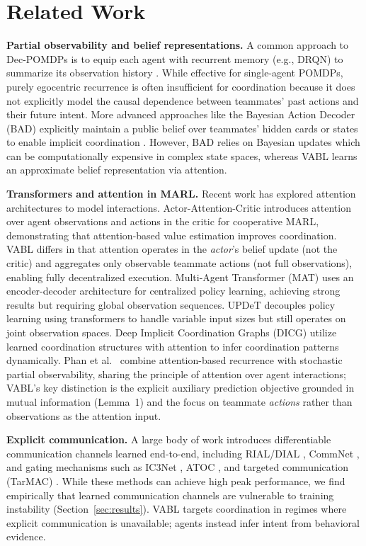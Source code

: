 \documentclass{article}
\theoremstyle{plain}
\theoremstyle{definition}
\theoremstyle{remark}
\begin{document}
\section{Related Work}

\textbf{Partial observability and belief representations.}
A common approach to Dec-POMDPs is to equip each agent with recurrent memory (e.g., DRQN) to summarize its observation history \cite{hausknecht2015deep}. While effective for single-agent POMDPs, purely egocentric recurrence is often insufficient for coordination because it does not explicitly model the causal dependence between teammates' past actions and their future intent. More advanced approaches like the Bayesian Action Decoder (BAD) explicitly maintain a public belief over teammates' hidden cards or states to enable implicit coordination \cite{foerster2019bad}. However, BAD relies on Bayesian updates which can be computationally expensive in complex state spaces, whereas VABL learns an approximate belief representation via attention.

\textbf{Transformers and attention in MARL.}
Recent work has explored attention architectures to model interactions. Actor-Attention-Critic \cite{iqbal2019actor} introduces attention over agent observations and actions in the critic for cooperative MARL, demonstrating that attention-based value estimation improves coordination. VABL differs in that attention operates in the \emph{actor}'s belief update (not the critic) and aggregates only observable teammate actions (not full observations), enabling fully decentralized execution. Multi-Agent Transformer (MAT) \cite{wen2022mat} uses an encoder-decoder architecture for centralized policy learning, achieving strong results but requiring global observation sequences. UPDeT \cite{hu2021updet} decouples policy learning using transformers to handle variable input sizes but still operates on joint observation spaces. Deep Implicit Coordination Graphs (DICG) \cite{li2020deep} utilize learned coordination structures with attention to infer coordination patterns dynamically. Phan et al.\ \cite{phan2023attention} combine attention-based recurrence with stochastic partial observability, sharing the principle of attention over agent interactions; VABL's key distinction is the explicit auxiliary prediction objective grounded in mutual information (Lemma~1) and the focus on teammate \emph{actions} rather than observations as the attention input.

\textbf{Explicit communication.}
A large body of work introduces differentiable communication channels learned end-to-end, including RIAL/DIAL \cite{foerster2016learning}, CommNet \cite{sukhbaatar2016commnet}, and gating mechanisms such as IC3Net \cite{singh2018ic3net}, ATOC \cite{jiang2018atoc}, and targeted communication (TarMAC) \cite{das2019tarmac}. While these methods can achieve high peak performance, we find empirically that learned communication channels are vulnerable to training instability (Section~\ref{sec:results}). VABL targets coordination in regimes where explicit communication is unavailable; agents instead infer intent from behavioral evidence.
\end{document}
